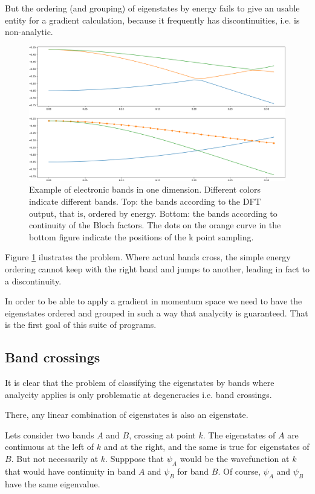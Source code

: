 \documentclass[a4paper,12pt]{report}
\begin{document}
But the ordering (and grouping) of eigenstates by energy fails to give an usable entity for a gradient calculation,
because it frequently has discontinuities, i.e. is non-analytic.
\begin{figure}
 \centering
 \includegraphics[scale=0.3,keepaspectratio=true]{figures/order_bands1D.png}
 \caption{Example of electronic bands in one dimension.
 Different colors indicate different bands.
 Top: the bands according to the DFT output, that is, ordered by energy.
 Bottom: the bands according to continuity of the Bloch factors.
 The dots on the orange curve in the bottom figure indicate the positions of the k point sampling.}
 \label{fig:orderbands}
\end{figure}
Figure \ref{fig:orderbands} ilustrates the problem.
Where actual bands cross, the simple energy ordering cannot keep with the right band and jumps to another,
leading in fact to a discontinuity.

In order to be able to apply a gradient in momentum space we need to have the eigenstates ordered and grouped
in such a way that analycity is guaranteed.
That is the first goal of this suite of programs.



\subsection*{Band crossings}\label{ssec:bandcrossings}

It is clear that the problem of classifying the eigenstates by bands where analycity applies is
only problematic at degeneracies i.e. band crossings.

There, any linear combination of eigenstates is also an eigenstate.

Lets consider two bands $A$ and $B$, crossing at point $k$.
The eigenstates of $A$ are continuous at the left of $k$ and at the right, and the same is true for eigenstates of $B$.
But not necessarily at $k$.
Supppose that $\psi_A$ would be the wavefunction at $k$ that would have continuity in band $A$
and $\psi_B$ for band $B$. Of course, $\psi_A$ and $\psi_B$ have the same eigenvalue.
\end{document}
